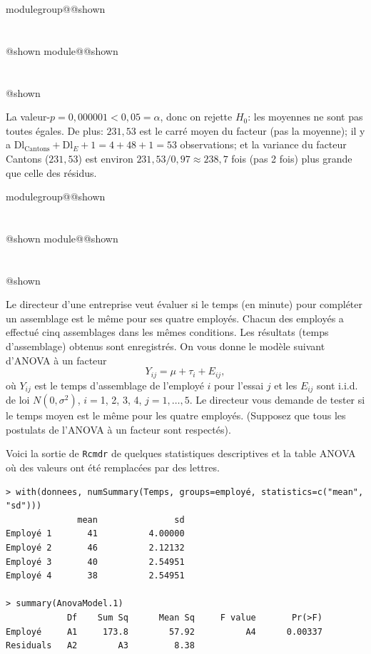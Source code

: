 \documentclass{Evaluation}
\makeatletter
\newcommand{\currentmodulekey}{}
\newcommand{\currentmoduletitle}{}
\newcommand{\currentgroupkey}{}
\newcommand{\currentgrouptitle}{}
\newcommand{\showmoduleifneeded}{%
  \ifx\currentgroupkey\empty\else
    \expandafter\ifx\csname modulegroup@\currentgroupkey @shown\endcsname\relax
      \section*{\currentgrouptitle}%
      \expandafter\gdef\csname modulegroup@\currentgroupkey @shown\endcsname{1}%
    \fi
  \fi
  \expandafter\ifx\csname module@\currentmodulekey @shown\endcsname\relax
    \section*{\currentmoduletitle}%
    \expandafter\gdef\csname module@\currentmodulekey @shown\endcsname{1}%
  \fi
}
\newenvironment{A22}{\showmoduleifneeded}{}
\newenvironment{A25}{\showmoduleifneeded}{}
\makeatother
\begin{document}
\begin{questions}
\begin{A25}
\begin{solution}
La valeur-$p = 0{,}000001 < 0{,}05 = \alpha$, donc on rejette $H_0$: les moyennes ne sont pas toutes égales. De plus: $231{,}53$ est le carré moyen du facteur (pas la moyenne); il y a $\text{Dl}_{\text{Cantons}}+\text{Dl}_E+1 = 4+48+1 = 53$ observations; et la variance du facteur Cantons ($231{,}53$) est environ $231{,}53/0{,}97 \approx 238{,}7$ fois (pas 2 fois) plus grande que celle des résidus.
\end{solution}
\end{A25}

\begin{A22}
\question {} %
Le directeur d'une entreprise veut évaluer si le temps (en minute) pour compléter un assemblage est le même pour ses quatre employés. Chacun des employés a effectué cinq assemblages dans les mêmes conditions. Les résultats (temps d'assemblage) obtenus sont enregistrés.
On vous donne le modèle suivant d'ANOVA à un facteur
$$Y_{ij}=\mu+\tau_i+E_{ij},$$
où $Y_{ij}$ est le temps d'assemblage de l'employé $i$ pour l'essai $j$ et
les $E_{ij}$ sont i.i.d. de loi $N(0,\sigma^2)$, $i=$1, 2, 3, 4,
$j=1,\ldots,5$.
Le directeur vous demande de tester si le temps moyen est le même pour les quatre employés.
(Supposez que tous les postulats de l'ANOVA à un facteur sont respectés).\medskip

Voici la sortie de \texttt{Rcmdr} de quelques statistiques descriptives et la table ANOVA où des valeurs ont été remplacées par des lettres.

\begin{verbatim}
> with(donnees, numSummary(Temps, groups=employé, statistics=c("mean", "sd")))
              mean               sd
Employé 1       41          4.00000
Employé 2       46          2.12132
Employé 3       40          2.54951
Employé 4       38          2.54951

> summary(AnovaModel.1)
            Df    Sum Sq      Mean Sq     F value       Pr(>F)
Employé     A1     173.8        57.92          A4      0.00337
Residuals   A2        A3         8.38
\end{verbatim}

\end{A22}
\end{questions}
\end{document}
